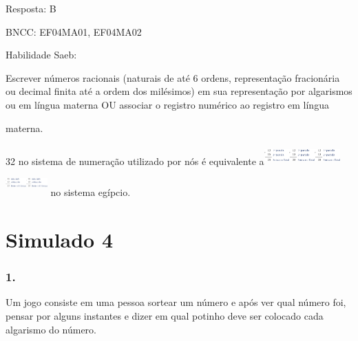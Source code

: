 \begin{enumerate}
\end{enumerate}

Resposta: B

BNCC: EF04MA01, EF04MA02

Habilidade Saeb:

Escrever números racionais (naturais de até 6 ordens, representação
fracionária ou decimal finita até a ordem dos milésimos) em sua
representação por algarismos ou em língua materna OU associar o registro
numérico ao registro em língua

materna.

32 no sistema de numeração utilizado por nós é equivalente
a\includegraphics[width=0.38337in,height=0.31669in]{media/image10.png}\includegraphics[width=0.38337in,height=0.31669in]{media/image10.png}\includegraphics[width=0.38337in,height=0.31669in]{media/image10.png}\includegraphics[width=0.31669in,height=0.41670in]{media/image11.png}\includegraphics[width=0.31669in,height=0.41670in]{media/image11.png}
no sistema egípcio.

\section{Simulado 4}\label{simulado-4}

\subsubsection{1. }\label{section-187}

Um jogo consiste em uma pessoa sortear um número e após ver qual número
foi, pensar por alguns instantes e dizer em qual potinho deve ser
colocado cada algarismo do número.

